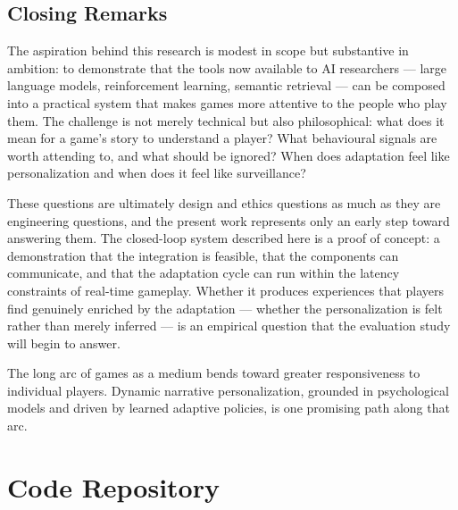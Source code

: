 \documentclass[12pt,a4paper]{report}
\begin{document}
\section{Closing Remarks}

The aspiration behind this research is modest in scope but substantive in ambition: to demonstrate that the tools now available to AI researchers --- large language models, reinforcement learning, semantic retrieval --- can be composed into a practical system that makes games more attentive to the people who play them. The challenge is not merely technical but also philosophical: what does it mean for a game's story to understand a player? What behavioural signals are worth attending to, and what should be ignored? When does adaptation feel like personalization and when does it feel like surveillance?

These questions are ultimately design and ethics questions as much as they are engineering questions, and the present work represents only an early step toward answering them. The closed-loop system described here is a proof of concept: a demonstration that the integration is feasible, that the components can communicate, and that the adaptation cycle can run within the latency constraints of real-time gameplay. Whether it produces experiences that players find genuinely enriched by the adaptation --- whether the personalization is felt rather than merely inferred --- is an empirical question that the evaluation study will begin to answer.

The long arc of games as a medium bends toward greater responsiveness to individual players. Dynamic narrative personalization, grounded in psychological models and driven by learned adaptive policies, is one promising path along that arc.






\appendix

\chapter{Code Repository}
\label{app:code}
\end{document}
